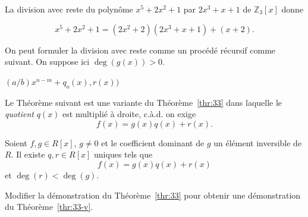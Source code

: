 

\begin{example}
  \label{exe:24}
  La division avec reste du polynôme $x^5+2x^2+1$ par $2x^3+x+1$ de $ℤ_3[x]$ donne

  \begin{displaymath}
    x^5+2x^2+1 = (2x^2 +2) (2x^3 + x +1) + (x+2). 
  \end{displaymath}
  
\end{example}

%
On peut formuler la division avec reste comme un procédé récursif comme suivant. On suppose ici  $\deg(g(x))>0$. 

\begin{algorithm}
  \caption{Division avec reste}\label{euclid}
  \begin{algorithmic}[1]
    \State{}
    \Else
    \State \Return $(a/b) x^{n-m} + q_o(x),r(x))$  
  \EndIf
  \EndProcedure
\end{algorithmic}
\end{algorithm}

Le Théorème suivant est une variante du Théorème~\ref{thr:33} dans laquelle le \emph{quotient} $q(x)$ est multiplié à droite, c.à.d. on exige
\begin{displaymath}
  f(x) = g(x) q(x) + r(x).  
\end{displaymath}

\begin{theorem}
  \label{thr:33-v}
  Soient $f,g \in R[x]$, $g ≠ 0$ et le coefficient dominant de $g$ un élément  inversible de $R$.   Il existe $q,r \in R[x]$ uniques tels que 
  \begin{displaymath}
    f(x) =  g(x) q(x) + r(x) 
  \end{displaymath}
  et $\deg(r) < \deg(g)$. 
\end{theorem}
\begin{exercise}
  \label{exe:61}
  Modifier la démonstration du Théorème~\ref{thr:33} pour obtenir une démonstration du Théorème~\ref{thr:33-v}. 
\end{exercise}



